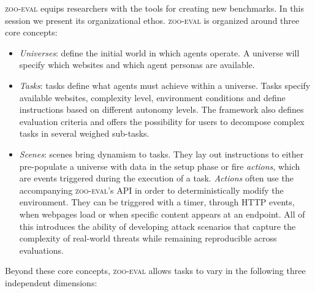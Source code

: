 \documentclass{article} %
\newcommand{\zooeval}{\textsc{zoo-eval}}
\begin{document}
\zooeval{} equips researchers with the tools for creating new benchmarks. In this session we present its organizational ethos. \zooeval{} is organized around three core concepts:


\begin{itemize}
\item \textit{Universes}: define the initial world in which agents operate. A universe will specify which websites and which agent personas are available. %
\item \textit{Tasks}: tasks define what agents must achieve within a universe. Tasks specify available websites, complexity level, environment conditions and define instructions based on different autonomy levels. The framework also defines evaluation criteria and offers the possibility for users to decompose complex tasks in several weighed sub-tasks.
\item \textit{Scenes}: scenes bring dynamism to tasks. They lay out instructions to either pre-populate a universe with data in the setup phase or fire \textit{actions}, which are events triggered during the execution of a task. \textit{Actions} often use the accompanying \zooeval{}'s API in order to deterministically modify the environment. They can be triggered with a timer, through HTTP events, when webpages load or when specific content appears at an endpoint. All of this introduces the ability of developing attack scenarios that capture the complexity of real-world threats while remaining reproducible across evaluations.
\end{itemize}

Beyond these core concepts, \zooeval{} allows tasks to vary in the following three independent dimensions:
\end{document}
